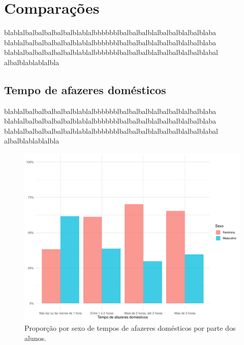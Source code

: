 

\chapter{Comparações}

blablalbalbalbalbalbalblablalbbbbbblbalbalbalblalbalbalblalbalblaba
blablalbalbalbalbalbalblablalbbbbbblbalbalbalblalbalbalblalbalblaba
blablalbalbalbalbalbalblablalbbbbbblbalbalbalblalbalbalblalbalblabal
albalblablablalbla

\section{Tempo de afazeres domésticos}

blablalbalbalbalbalbalblablalbbbbbblbalbalbalblalbalbalblalbalblaba
blablalbalbalbalbalbalblablalbbbbbblbalbalbalblalbalbalblalbalblaba
blablalbalbalbalbalbalblablalbbbbbblbalbalbalblalbalbalblalbalblabal
albalblablablalbla


\newpage
\begin{figure}[h]
    \caption{Proporção por sexo de tempos de afazeres domésticos por parte
    dos alunos.}
    \begin{center}
        \includegraphics[width=16cm]{img/sexo_afazeres.pdf}
    \end{center}
\end{figure}

